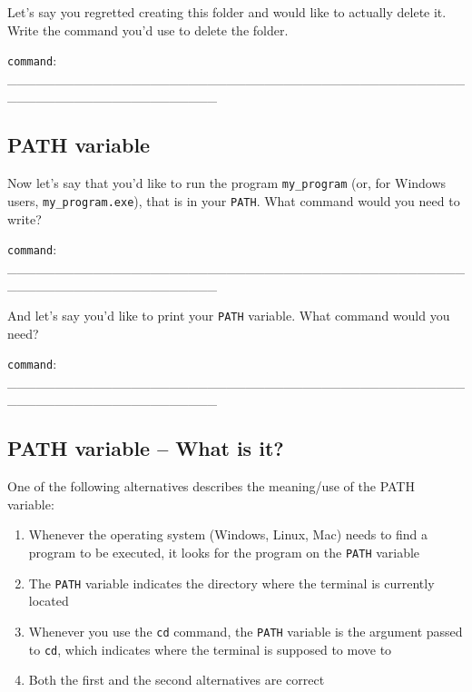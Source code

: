 \documentclass[a4paper,11pt]{scrartcl}
\begin{document}
Let's say you regretted creating this folder and would like to actually delete
it. Write the command you'd use to delete the folder.

\verb|command|: \_\_\_\_\_\_\_\_\_\_\_\_\_\_\_\_\_\_\_\_\_\_\_\_\_\_\_\_\_\_\_\_\_\_\_\_\_\_\_\_\_\_\_\_\_\_\_\_\_\_\_\_\_\_\_\_\_\_\_\_\_\_\_\_\_\_\_\_\_\_



\subsection{PATH variable}

Now let's say that you'd like to run the program \verb|my_program| (or, for
Windows users, \verb|my_program.exe|), that is in your \verb|PATH|. What
command would you need to write?

\verb|command|: \_\_\_\_\_\_\_\_\_\_\_\_\_\_\_\_\_\_\_\_\_\_\_\_\_\_\_\_\_\_\_\_\_\_\_\_\_\_\_\_\_\_\_\_\_\_\_\_\_\_\_\_\_\_\_\_\_\_\_\_\_\_\_\_\_\_\_\_\_\_
 

And let's say you'd like to print your \verb|PATH| variable. What command
would you need?

\verb|command|: \_\_\_\_\_\_\_\_\_\_\_\_\_\_\_\_\_\_\_\_\_\_\_\_\_\_\_\_\_\_\_\_\_\_\_\_\_\_\_\_\_\_\_\_\_\_\_\_\_\_\_\_\_\_\_\_\_\_\_\_\_\_\_\_\_\_\_\_\_\_
 

\subsection{PATH variable -- What is it?}

One of the following alternatives describes the meaning/use of the PATH variable:

\begin{enumerate}[label=\alph*)]
\onehalfspacing
\item Whenever the operating system (Windows, Linux, Mac) needs to find a
program to be executed, it looks for the program on the \verb|PATH| variable

\item The \verb|PATH| variable indicates the directory where the terminal
is currently located

\item Whenever you use the \verb|cd| command, the \verb|PATH| variable is
the argument passed to \verb|cd|, which indicates where the terminal is supposed
to move to

\item Both the first and the second alternatives are correct
\end{enumerate}
\end{document}
